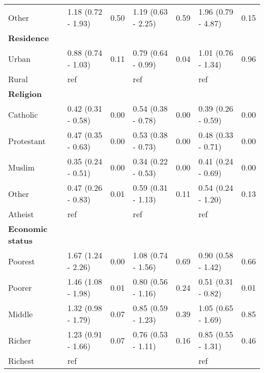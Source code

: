 \documentclass[sn-basic,Numbered,pdflatex]{sn-jnl}
\theoremstyle{remark}
\theoremstyle{definition}
\begin{document}
\begin{table}
\begin{tabular}[t]{>{\raggedright\arraybackslash}p{2cm}llllll}
\hspace{1em}Other & 1.18 (0.72 - 1.93) & 0.50 & 1.19 (0.63 - 2.25) & 0.59 & 1.96 (0.79 - 4.87) & 0.15\\
\textbf{Residence} & \textbf{} & \textbf{} & \textbf{} & \textbf{} & \textbf{} & \textbf{}\\
\hspace{1em}Urban & 0.88 (0.74 - 1.03) & 0.11 & 0.79 (0.64 - 0.99) & 0.04 & 1.01 (0.76 - 1.34) & 0.96\\
\hspace{1em}Rural & ref &  & ref &  & ref & \\
\addlinespace
\textbf{Religion} & \textbf{} & \textbf{} & \textbf{} & \textbf{} & \textbf{} & \textbf{}\\
\hspace{1em}Catholic & 0.42 (0.31 - 0.58) & 0.00 & 0.54 (0.38 - 0.78) & 0.00 & 0.39 (0.26 - 0.59) & 0.00\\
\hspace{1em}Protestant & 0.47 (0.35 - 0.63) & 0.00 & 0.53 (0.38 - 0.73) & 0.00 & 0.48 (0.33 - 0.71) & 0.00\\
\hspace{1em}Muslim & 0.35 (0.24 - 0.51) & 0.00 & 0.34 (0.22 - 0.53) & 0.00 & 0.41 (0.24 - 0.69) & 0.00\\
\hspace{1em}Other & 0.47 (0.26 - 0.83) & 0.01 & 0.59 (0.31 - 1.13) & 0.11 & 0.54 (0.24 - 1.20) & 0.13\\
\addlinespace
\hspace{1em}Atheist & ref &  & ref &  & ref & \\
\textbf{Economic status} & \textbf{} & \textbf{} & \textbf{} & \textbf{} & \textbf{} & \textbf{}\\
\hspace{1em}Poorest & 1.67 (1.24 - 2.26) & 0.00 & 1.08 (0.74 - 1.56) & 0.69 & 0.90 (0.58 - 1.42) & 0.66\\
\hspace{1em}Poorer & 1.46 (1.08 - 1.98) & 0.01 & 0.80 (0.56 - 1.16) & 0.24 & 0.51 (0.31 - 0.82) & 0.01\\
\hspace{1em}Middle & 1.32 (0.98 - 1.79) & 0.07 & 0.85 (0.59 - 1.23) & 0.39 & 1.05 (0.65 - 1.69) & 0.85\\
\addlinespace
\hspace{1em}Richer & 1.23 (0.91 - 1.66) & 0.07 & 0.76 (0.53 - 1.11) & 0.16 & 0.85 (0.55 - 1.31) & 0.46\\
\hspace{1em}Richest & ref &  &  &  & ref & \\

\end{tabular}
\end{table}
\end{document}
